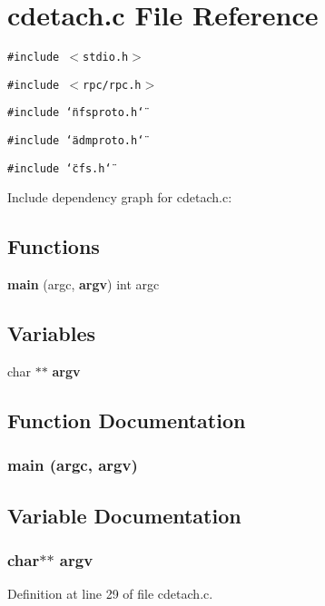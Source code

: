 \section{cdetach.c File Reference}
\label{cdetach_8c}


{\tt \#include $<$stdio.h$>$}\par
{\tt \#include $<$rpc/rpc.h$>$}\par
{\tt \#include \char`\"{}nfsproto.h\char`\"{}}\par
{\tt \#include \char`\"{}admproto.h\char`\"{}}\par
{\tt \#include \char`\"{}cfs.h\char`\"{}}\par


Include dependency graph for cdetach.c:\subsection*{Functions}
\begin{CompactItemize}
\item 
{\bf main} (argc, {\bf argv}) int argc
\end{CompactItemize}
\subsection*{Variables}
\begin{CompactItemize}
\item 
char $\ast$$\ast$ {\bf argv}
\end{CompactItemize}


\subsection{Function Documentation}
\subsubsection{\setlength{\rightskip}{0pt plus 5cm}main (argc, {\bf argv})}\label{cdetach_8c_a1}




\subsection{Variable Documentation}
\subsubsection{\setlength{\rightskip}{0pt plus 5cm}char$\ast$$\ast$ {\bf argv}}\label{cdetach_8c_a0}




Definition at line 29 of file cdetach.c.